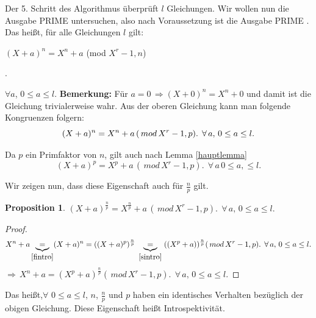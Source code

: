 \documentclass[12pt,oneside]{article}
\newtheorem{prop}{Proposition}[section]
\theoremstyle{remark}
\theoremstyle{definition}
\begin{document}
Der 5. Schritt des Algorithmus überprüft $l$ Gleichungen. Wir wollen nun die Ausgabe PRIME untersuchen, also nach Voraussetzung ist die Ausgabe PRIME . Das heißt, für alle Gleichungen $l$ gilt:\newline\newline
\centerline{$(X + a)^n = X^n + a $ (mod $X^r - 1, n$)}.

$\forall a$, $ 0 \leq a \leq l$.\newline\newline
\textbf{Bemerkung:} Für $a = 0 \,  \Rightarrow (X + 0)^n = X^n + 0$ und damit ist die Gleichung trivialerweise wahr.\newline\newline 
Aus der oberen Gleichung kann man folgende Kongruenzen folgern:
\begin{equation}\label{fintro}
(X + a)^n = X^n + a \, (\, mod \, X^r - 1, p).
\; \, \forall\,a, \, 0 \leq a \leq l.\newline\newline
\end{equation}

Da $p$ ein Primfaktor von $n$, gilt auch nach Lemma \ref{hauptlemma} \newline
\begin{equation}\label{sintro}
    (X + a)^p = X^p + a \, (\, mod \, X^r - 1, p). \; \, \forall\,a \, 0 \leq a, \leq l.
\end{equation}

Wir zeigen nun, dass diese Eigenschaft auch für $\frac{n}{p}$ gilt.\newline

\begin{prop}
$(X + a)^{\frac{n}{p}} = X^{\frac{n}{p}} + a \, (\, mod \, X^r -1,p). \; \, \forall\,a, \,  0 \leq a \leq l.$
\end{prop}

\begin{proof}
\begin{align*}
    X^{n} + a \underbrace{=}_{\ref{fintro}} (X + a)^n = ((X + a)^{p})^{\frac{n}{p}} \; \underbrace{=}_{\ref{sintro}} \; ((X^{p} + a))^{\frac{n}{p}} (\, mod \, X^r - 1,p). \; \, \forall\,a, \, 0 \leq a \leq l.
\end{align*}
$\Rightarrow \, X^{n} + a = (X^{p} + a)^{\frac{n}{p}} (\, mod \, X^r - 1,p). \; \, \forall\,a, \, 0 \leq a \leq l.$
\end{proof}

Das heißt,$\forall$ $0 \leq a \leq l$, $n$, $\frac{n}{p}$ und $p$ haben ein identisches Verhalten bezüglich der obigen Gleichung. Diese Eigenschaft heißt Introspektivität.\newline    
\end{document}
